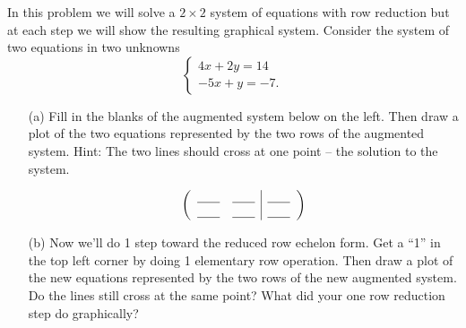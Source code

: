 \begin{problem}
    In this problem we will solve a $2 \times 2$ system of equations with row reduction
    but at each step we will show the resulting graphical system.  Consider the system of two
    equations in two unknowns
    \[ \left\{ \begin{array}{ll} 4x + 2y = 14 \\ -5x + y = -7. \end{array} \right. \]
    \begin{enumerate}
        \item[(a)] Fill in the blanks of the augmented system below on the left.  Then
            draw a plot of the two equations represented by the two rows of the augmented
            system.  Hint: The two lines should cross at one point -- the solution to the
            system.

            \begin{minipage}{0.3\columnwidth}
                \[ \left( \begin{array}{cc|c} \underline{\hspace{0.25in}} &
                        \underline{\hspace{0.25in}} &  \underline{\hspace{0.25in}} \\  \underline{\hspace{0.25in}} &
                        \underline{\hspace{0.25in}} &  \underline{\hspace{0.25in}}
                \end{array} \right) \]
            \end{minipage}
            \begin{minipage}{0.6\columnwidth}
            \begin{center}
            \end{center}
            \end{minipage}
        \item[(b)] Now we'll do 1 step toward the reduced row echelon form.  Get a ``1''
            in the top left corner by doing 1 elementary row operation. Then
            draw a plot of the new equations represented by the two rows of the new augmented
            system.  Do the lines still cross at the same point? What did your one row
            reduction step do graphically?


\end{enumerate}
\end{problem}
